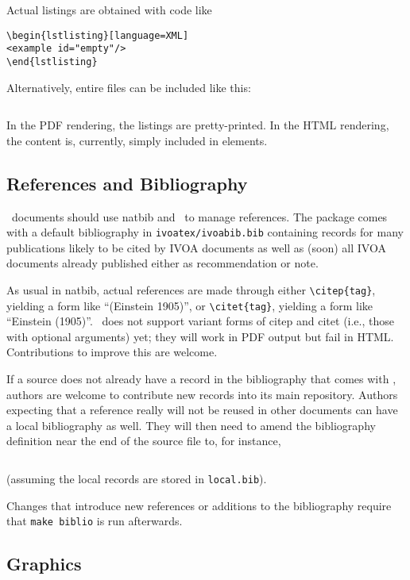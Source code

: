 \documentclass[11pt,a4paper]{ivoa}
\begin{document}
Actual listings are obtained with code like
\begin{verbatim}
\begin{lstlisting}[language=XML]
<example id="empty"/>
\end{lstlisting}
\end{verbatim}
Alternatively, entire files can be included like this:
\begin{verbatim}

\end{verbatim}
In the PDF rendering, the listings are pretty-printed.  In the HTML
rendering, the content is, currently, simply included in  elements.

\subsection{References and Bibliography}

\ivoatex\ documents should use natbib and \BibTeX\ to manage references.
The package comes with a default bibliography in
\texttt{ivoatex/ivoabib.bib} containing records for many publications
likely to be cited by IVOA documents as well as (soon) all IVOA
documents already published either as recommendation or note. 

As usual in natbib, actual references are made through either
\verb|\citep{tag}|, yielding a form like ``(Einstein 1905)'',
or \verb|\citet{tag}|, yielding a form like ``Einstein (1905)''.
\ivoatex\ does not support variant forms of citep and citet (i.e., those
with optional arguments) yet; they will work in PDF output but fail in
HTML.  Contributions to improve this are welcome.


If a source does not already have a record in the bibliography that
comes with \ivoatex, authors are welcome to contribute new records into
its main repository.  Authors expecting that a reference really will not
be reused in other documents can have a local bibliography as well.
They will then need to amend the bibliography definition near the end of
the source file to, for instance,
\begin{lstlisting}[language=tex]

\end{lstlisting}
(assuming the local records are stored in \texttt{local.bib}).

Changes that introduce new references or additions to the bibliography
require that \texttt{make biblio} is run afterwards.

\subsection{Graphics}
\end{document}
